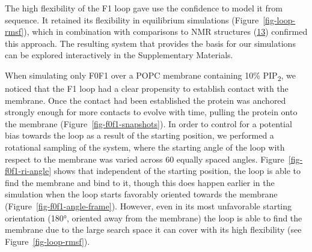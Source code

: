 \documentclass[
  twocolumn]{biophys-new-mod}
\begin{document}
The high flexibility of the F1 loop gave use the confidence to model it
from sequence. It retained its flexibility in equilibrium simulations
(Figure~\ref{fig-loop-rmsf}), which in combination with comparisons to
NMR structures
(\protect\hyperlink{ref-goultStructureDoubleUbiquitinlike2010}{13})
confirmed this approach. The resulting system that provides the basis
for our simulations can be explored interactively in the Supplementary
Materials.

When simulating only F0F1 over a POPC membrane containing 10\%
PIP\textsubscript{2}, we noticed that the F1 loop had a clear propensity
to establish contact with the membrane. Once the contact had been
established the protein was anchored strongly enough for more contacts
to evolve with time, pulling the protein onto the membrane
(Figure~\ref{fig-f0f1-snapshots}). In order to control for a potential
bias towards the loop as a result of the starting position, we performed
a rotational sampling of the system, where the starting angle of the
loop with respect to the membrane was varied across 60 equally spaced
angles. Figure~\ref{fig-f0f1-ri-angle} shows that independent of the
starting position, the loop is able to find the membrane and bind to it,
though this does happen earlier in the simulation when the loop starts
favorably oriented towards the membrane
(Figure~\ref{fig-f0f1-angle-frame}). However, even in its most
unfavorable starting orientation (180°, oriented away from the membrane)
the loop is able to find the membrane due to the large search space it
can cover with its high flexibility (see Figure~\ref{fig-loop-rmsf}).
\end{document}

